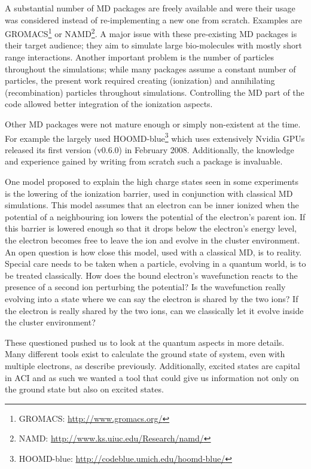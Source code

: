 A substantial number of MD packages are freely available and were
their usage was considered instead of re-implementing a new one from scratch.
Examples are GROMACS\footnote{GROMACS:
\url{http://www.gromacs.org/}} or NAMD\footnote{NAMD:
\url{http://www.ks.uiuc.edu/Research/namd/}}. A major issue with these
pre-existing MD packages is their target audience; they aim to simulate large
bio-molecules with mostly short range interactions. Another important problem
is the number of particles throughout the simulations; while many packages
assume a constant number of particles, the present work required creating
(ionization) and annihilating (recombination) particles throughout simulations.
Controlling the MD part of the code allowed better integration of the
ionization aspects.

Other MD packages were not mature enough or simply non-existent at the time.
For example the largely used HOOMD-blue\footnote{HOOMD-blue:
\url{http://codeblue.umich.edu/hoomd-blue/}} which uses extensively
Nvidia GPUs released its first version (v0.6.0) in February 2008.
Additionally, the knowledge and experience gained by writing from scratch such
a package is invaluable.






One model proposed to explain the high charge states seen in some experiments
is the lowering of the ionization barrier, used in conjunction with classical
MD simulations. This model assumes that an electron can be inner ionized when
the potential of a neighbouring ion lowers the potential of the electron's
parent ion. If this barrier is lowered enough so that it drops below the
electron's energy level, the electron becomes free to leave the ion and evolve
in the cluster environment. An open question is how close this model, used
with a classical MD, is to reality. Special care needs to be taken when a
particle, evolving in a quantum world, is to be treated classically. How does
the bound electron's wavefunction reacts to the presence of a second ion
perturbing the potential? Is the wavefunction really evolving into a state
where we can say the electron is shared by the two ions? If the electron is
really shared by the two ions, can we classically let it evolve inside the
cluster environment?

These questioned pushed us to look at the quantum aspects in more details. Many
different tools exist to calculate the ground state of system, even with
multiple electrons, as describe previously. Additionally, excited states are
capital in ACI and as such we wanted a tool that could give us information not
only on the ground state but also on excited states.

